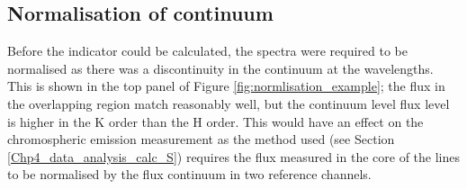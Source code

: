 \subsection{Normalisation of continuum}
\label{Chp4_data_analysis_normalise_cont}
Before the \Rprime indicator could be calculated, the spectra were required to be normalised as there was a discontinuity in the continuum at the \caII wavelengths. This is shown in the top panel of Figure \ref{fig:normlisation_example}; the flux in the overlapping region match reasonably well, but the continuum level flux level is higher in the K order than the H order. This would have an effect on the chromospheric emission measurement as the method used (see Section \ref{Chp4_data_analysis_calc_S}) requires the flux measured in the core of the \caII lines to be normalised by the flux continuum in two reference channels.


